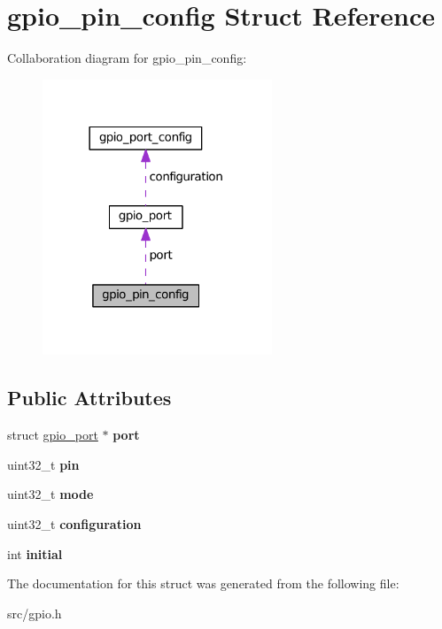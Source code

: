 \hypertarget{structgpio__pin__config}{}\section{gpio\+\_\+pin\+\_\+config Struct Reference}
\label{structgpio__pin__config}


Collaboration diagram for gpio\+\_\+pin\+\_\+config\+:\nopagebreak
\begin{figure}[H]
\begin{center}
\leavevmode
\includegraphics[width=194pt]{structgpio__pin__config__coll__graph}
\end{center}
\end{figure}
\subsection*{Public Attributes}
\begin{DoxyCompactItemize}
\item 
\hypertarget{structgpio__pin__config_a72fc1227f3fab0d1e2485d8f4bed6dbc}{}struct \hyperlink{structgpio__port}{gpio\+\_\+port} $\ast$ {\bfseries port}\label{structgpio__pin__config_a72fc1227f3fab0d1e2485d8f4bed6dbc}

\item 
\hypertarget{structgpio__pin__config_afb9b5bbf5c85e22120e7ef67964b621a}{}uint32\+\_\+t {\bfseries pin}\label{structgpio__pin__config_afb9b5bbf5c85e22120e7ef67964b621a}

\item 
\hypertarget{structgpio__pin__config_a799cc96abd94ffdc23f888a9ed1556ca}{}uint32\+\_\+t {\bfseries mode}\label{structgpio__pin__config_a799cc96abd94ffdc23f888a9ed1556ca}

\item 
\hypertarget{structgpio__pin__config_a1ba8ae193e2164dd8c4238c81d9200e4}{}uint32\+\_\+t {\bfseries configuration}\label{structgpio__pin__config_a1ba8ae193e2164dd8c4238c81d9200e4}

\item 
\hypertarget{structgpio__pin__config_a195076654c4665c2dae2702f4bce5dfd}{}int {\bfseries initial}\label{structgpio__pin__config_a195076654c4665c2dae2702f4bce5dfd}

\end{DoxyCompactItemize}


The documentation for this struct was generated from the following file\+:\begin{DoxyCompactItemize}
\item 
src/gpio.\+h\end{DoxyCompactItemize}
